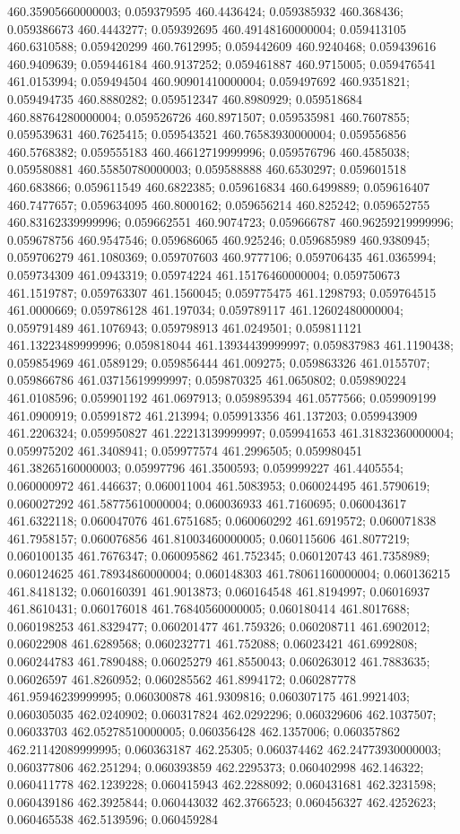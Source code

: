 460.35905660000003; 0.059379595 460.4436424; 0.059385932 460.368436; 0.059386673 460.4443277; 0.059392695 460.49148160000004; 0.059413105 460.6310588; 0.059420299 460.7612995; 0.059442609 460.9240468; 0.059439616 460.9409639; 0.059446184 460.9137252; 0.059461887 460.9715005; 0.059476541 461.0153994; 0.059494504 460.90901410000004; 0.059497692 460.9351821; 0.059494735 460.8880282; 0.059512347 460.8980929; 0.059518684 460.88764280000004; 0.059526726 460.8971507; 0.059535981 460.7607855; 0.059539631 460.7625415; 0.059543521 460.76583930000004; 0.059556856 460.5768382; 0.059555183 460.46612719999996; 0.059576796 460.4585038; 0.059580881 460.55850780000003; 0.059588888 460.6530297; 0.059601518 460.683866; 0.059611549 460.6822385; 0.059616834 460.6499889; 0.059616407 460.7477657; 0.059634095 460.8000162; 0.059656214 460.825242; 0.059652755 460.83162339999996; 0.059662551 460.9074723; 0.059666787 460.96259219999996; 0.059678756 460.9547546; 0.059686065 460.925246; 0.059685989 460.9380945; 0.059706279 461.1080369; 0.059707603 460.9777106; 0.059706435 461.0365994; 0.059734309 461.0943319; 0.05974224 461.15176460000004; 0.059750673 461.1519787; 0.059763307 461.1560045; 0.059775475 461.1298793; 0.059764515 461.0000669; 0.059786128 461.197034; 0.059789117 461.12602480000004; 0.059791489 461.1076943; 0.059798913 461.0249501; 0.059811121 461.13223489999996; 0.059818044 461.13934439999997; 0.059837983 461.1190438; 0.059854969 461.0589129; 0.059856444 461.009275; 0.059863326 461.0155707; 0.059866786 461.03715619999997; 0.059870325 461.0650802; 0.059890224 461.0108596; 0.059901192 461.0697913; 0.059895394 461.0577566; 0.059909199 461.0900919; 0.05991872 461.213994; 0.059913356 461.137203; 0.059943909 461.2206324; 0.059950827 461.22213139999997; 0.059941653 461.31832360000004; 0.059975202 461.3408941; 0.059977574 461.2996505; 0.059980451 461.38265160000003; 0.05997796 461.3500593; 0.059999227 461.4405554; 0.060000972 461.446637; 0.060011004 461.5083953; 0.060024495 461.5790619; 0.060027292 461.58775610000004; 0.060036933 461.7160695; 0.060043617 461.6322118; 0.060047076 461.6751685; 0.060060292 461.6919572; 0.060071838 461.7958157; 0.060076856 461.81003460000005; 0.060115606 461.8077219; 0.060100135 461.7676347; 0.060095862 461.752345; 0.060120743 461.7358989; 0.060124625 461.78934860000004; 0.060148303 461.78061160000004; 0.060136215 461.8418132; 0.060160391 461.9013873; 0.060164548 461.8194997; 0.06016937 461.8610431; 0.060176018 461.76840560000005; 0.060180414 461.8017688; 0.060198253 461.8329477; 0.060201477 461.759326; 0.060208711 461.6902012; 0.06022908 461.6289568; 0.060232771 461.752088; 0.06023421 461.6992808; 0.060244783 461.7890488; 0.06025279 461.8550043; 0.060263012 461.7883635; 0.06026597 461.8260952; 0.060285562 461.8994172; 0.060287778 461.95946239999995; 0.060300878 461.9309816; 0.060307175 461.9921403; 0.060305035 462.0240902; 0.060317824 462.0292296; 0.060329606 462.1037507; 0.06033703 462.05278510000005; 0.060356428 462.1357006; 0.060357862 462.21142089999995; 0.060363187 462.25305; 0.060374462 462.24773930000003; 0.060377806 462.251294; 0.060393859 462.2295373; 0.060402998 462.146322; 0.060411778 462.1239228; 0.060415943 462.2288092; 0.060431681 462.3231598; 0.060439186 462.3925844; 0.060443032 462.3766523; 0.060456327 462.4252623; 0.060465538 462.5139596; 0.060459284 